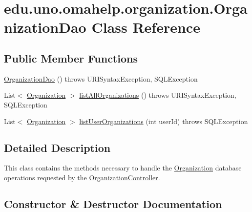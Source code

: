 \hypertarget{classedu_1_1uno_1_1omahelp_1_1organization_1_1_organization_dao}{}\section{edu.\+uno.\+omahelp.\+organization.\+Organization\+Dao Class Reference}
\label{classedu_1_1uno_1_1omahelp_1_1organization_1_1_organization_dao}
\subsection*{Public Member Functions}
\begin{DoxyCompactItemize}
\item 
\mbox{\hyperlink{classedu_1_1uno_1_1omahelp_1_1organization_1_1_organization_dao_a88678c75366e626aa880d5e566553c7a}{Organization\+Dao}} ()  throws U\+R\+I\+Syntax\+Exception, S\+Q\+L\+Exception 
\item 
List$<$ \mbox{\hyperlink{classedu_1_1uno_1_1omahelp_1_1organization_1_1_organization}{Organization}} $>$ \mbox{\hyperlink{classedu_1_1uno_1_1omahelp_1_1organization_1_1_organization_dao_a92b3c1daf59ccd4abdc594dae27cbbd0}{list\+All\+Organizations}} ()  throws U\+R\+I\+Syntax\+Exception, S\+Q\+L\+Exception 
\item 
List$<$ \mbox{\hyperlink{classedu_1_1uno_1_1omahelp_1_1organization_1_1_organization}{Organization}} $>$ \mbox{\hyperlink{classedu_1_1uno_1_1omahelp_1_1organization_1_1_organization_dao_af0fc342f36ca6cde5e8560aded7b6a3f}{list\+User\+Organizations}} (int user\+Id)  throws S\+Q\+L\+Exception 
\end{DoxyCompactItemize}


\subsection{Detailed Description}
This class contains the methods necessary to handle the \mbox{\hyperlink{classedu_1_1uno_1_1omahelp_1_1organization_1_1_organization}{Organization}} database operations requested by the \mbox{\hyperlink{classedu_1_1uno_1_1omahelp_1_1organization_1_1_organization_controller}{Organization\+Controller}}. 

\subsection{Constructor \& Destructor Documentation}
\mbox{\label{classedu_1_1uno_1_1omahelp_1_1organization_1_1_organization_dao_a88678c75366e626aa880d5e566553c7a}} 
